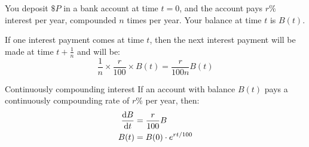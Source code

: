 \begin{frame}[t]

You deposit $\$P$ in a bank
account at time $t=0$, and the account pays $r\%$ interest per year,
compounded $n$ times per year. Your balance at time $t$ is $B(t)$.


\pause
If one interest payment comes at time $t$, then the next interest payment will be made at time $t+\frac{1}{n}$
and will be: \[\frac{1}{n}\times\frac{r}{100}\times B(t)=\frac{r}{100n}B(t)\]

\end{frame}
\begin{frame}[t]
\begin{block}{Continuously compounding interest}
If an account with balance $B(t)$ pays a continuously compounding rate of $r$\% per year, then:
\begin{align*}
\frac{\text{d}B}{\text{d}t}&=\frac{r}{100}B\\
B(t)&=B(0)\cdot e^{rt/100}
\end{align*}
\end{block}
\end{frame}
